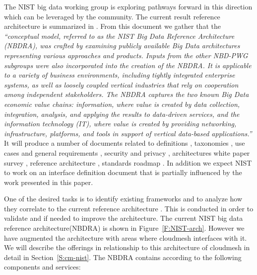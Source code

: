 The NIST big data working group is exploring pathways forward in this
direction which can be leveraged by the community. The current result
reference architecture is summarized in \cite{nist-bd}. From this
document we gather that the {\it ``conceptual model, referred to as
  the NIST Big Data Reference Architecture (NBDRA), was crafted by
  examining publicly available Big Data architectures representing
  various approaches and products. Inputs from the other NBD-PWG
  subgroups were also incorporated into the creation of the NBDRA. It
  is applicable to a variety of business environments, including
  tightly integrated enterprise systems, as well as loosely coupled
  vertical industries that rely on cooperation among independent
  stakeholders. The NBDRA captures the two known Big Data economic
  value chains: information, where value is created by data
  collection, integration, analysis, and applying the results to
  data-driven services, and the information technology (IT), where
  value is created by providing networking, infrastructure, platforms,
  and tools in support of vertical data-based applications.''}  It
will produce a number of documents related to definitions
\cite{nist-bd-v1}, taxonomies \cite{nist-bd-v2}, use cases and general
requirements \cite{nist-bd-v3}, security and privacy
\cite{nist-bd-v4}, architectures white paper survey \cite{nist-bd-v5},
reference architecture \cite{nist-bd}, standards roadmap
\cite{nist-bd-v7}. In addition we expect NIST to work on an interface
definition document that is partially influenced by the work presented
in this paper.

One of the desired tasks is to identify existing frameworks and to
analyze how they correlate to the current reference architecture
\cite{nist-bd}. This is conducted in order to validate and if needed
to improve the architecture.  The current NIST big data reference
architecture(NBDRA) is shown in Figure~\ref{F:NIST-arch}. However we have
augmented the architecture with areas where cloudmesh interfaces with
it. We will describe the offerings in relationship to this
architecture of cloudmesh in detail in Section~\ref{S:cm-nist}.  The
NBDRA contains according to \cite{nist-bd} the following
components and services:

